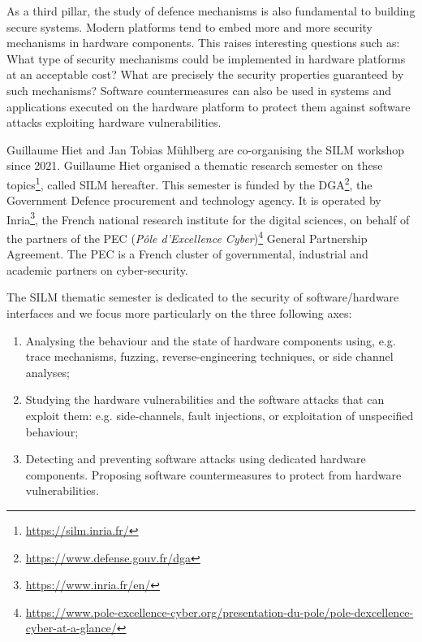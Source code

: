 \documentclass[a4paper,11pt]{article}
\begin{document}
As a third pillar, the study of defence mechanisms is also fundamental to
building secure systems. Modern platforms tend to embed more and more
security mechanisms in hardware components. This raises interesting
questions such as: What type of security mechanisms could be implemented in
hardware platforms at an acceptable cost? What are precisely the security
properties guaranteed by such mechanisms? Software countermeasures can also
be used in systems and applications executed on the hardware platform to
protect them against software attacks exploiting hardware vulnerabilities.

Guillaume Hiet and Jan Tobias M\"uhlberg are co-organising the SILM
workshop since 2021.
Guillaume Hiet organised a thematic
research semester on these topics\footnote{\url{https://silm.inria.fr/}},
called SILM hereafter. This semester is funded by the
DGA\footnote{\url{https://www.defense.gouv.fr/dga}}, the Government Defence
procurement and technology agency. It is  operated by
Inria\footnote{\url{https://www.inria.fr/en/}}, the French national
research institute for the digital sciences, on behalf of the partners of
the PEC (\textit{Pôle d'Excellence
Cyber})\footnote{\url{https://www.pole-excellence-cyber.org/presentation-du-pole/pole-dexcellence-cyber-at-a-glance/}}
General Partnership Agreement. The PEC is a French cluster of governmental,
industrial and academic partners on cyber-security.

The SILM thematic semester is dedicated to the security of
software/hardware interfaces and we focus more particularly on the three
following axes:

\begin{enumerate}
%
    \item Analysing the behaviour and the state of hardware components
using, e.g. trace mechanisms, fuzzing, reverse-engineering techniques, or
side channel analyses;
%
    \item Studying the hardware vulnerabilities and the software attacks
that can exploit them: e.g. side-channels, fault injections, or
exploitation of unspecified behaviour;
%
    \item Detecting and preventing software attacks using dedicated
hardware components. Proposing software countermeasures to protect from
hardware vulnerabilities.
%
\end{enumerate}
\end{document}
